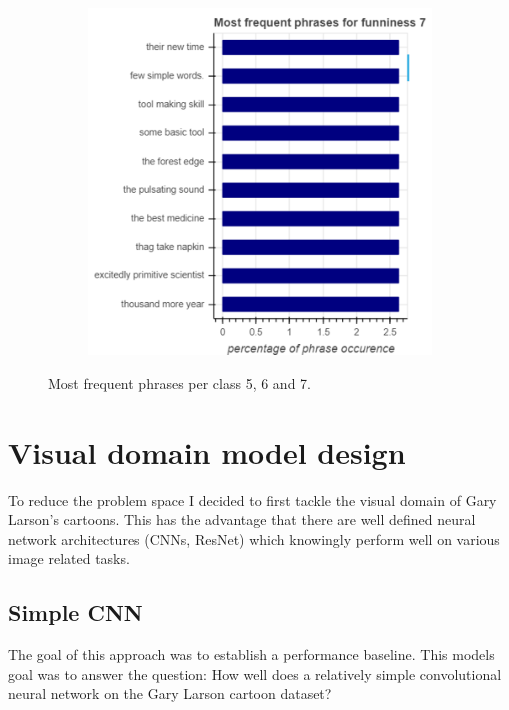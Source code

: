 \documentclass[draft,final,oneside]{vutinfth} %
\begin{document}
\begin{figure}
\begin{subfigure}[b]{0.45\textwidth}
\centering
\includegraphics[width=1.0\textwidth]{graphics/phrases/funniness_7}
\end{subfigure}

\caption{Most frequent phrases per class 5, 6 and 7.}
\label{fig:phraseocc2}

\end{figure}

\section{Visual domain model design}

To reduce the problem space I decided to first tackle the visual domain of Gary Larson's cartoons. This has the advantage that there are well defined neural network architectures (CNNs, ResNet) which knowingly perform well on various image related tasks.

\subsection{Simple CNN}

The goal of this approach was to establish a performance baseline. This models goal was to answer the question: How well does a relatively simple convolutional neural network on the Gary Larson cartoon dataset?
\end{document}
